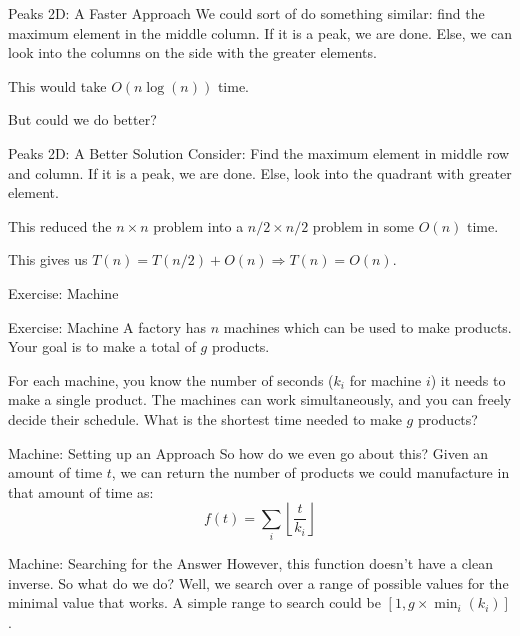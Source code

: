 \documentclass[9pt]{beamer}
\newenvironment{exbox}[1]{\begin{block}{Exercise: #1}}{\end{block}}
\begin{document}
\begin{frame}{Peaks 2D: A Faster Approach}
We could sort of do something similar: find the maximum element in the middle column. If it is a peak, we are done. Else, we can look into the columns on the side with the greater elements.

This would take $O(n\log(n))$ time.

But could we do better?
\end{frame}

\begin{frame}{Peaks 2D: A Better Solution}
Consider: Find the maximum element in middle row and column. If it is a peak, we are done. Else, look into the quadrant with greater element.

This reduced the $n \times n$ problem into a $n/2 \times n/2$ problem in some $O(n)$ time.

This gives us $T(n) = T(n/2) + O(n) \Rightarrow T(n) = O(n)$.
\end{frame}

\begin{frame}{Exercise: Machine}
\begin{exbox}{Machine}
A factory has $n$ machines which can be used to make products. Your goal is to make a total of $g$ products.

For each machine, you know the number of seconds ($k_i$ for machine $i$) it needs to make a single product. The machines can work simultaneously, and you can freely decide their schedule. What is the shortest time needed to make $g$ products?
\end{exbox}
\end{frame}

\begin{frame}{Machine: Setting up an Approach}
So how do we even go about this? Given an amount of time $t$, we can return the number of products we could manufacture in that amount of time as:
\[
f(t) = \sum_i \left\lfloor \frac{t}{k_i} \right\rfloor
\]
\end{frame}

\begin{frame}{Machine: Searching for the Answer}
However, this function doesn't have a clean inverse. So what do we do? Well, we search over a range of possible values for the minimal value that works. A simple range to search could be $[1, g \times \min_i(k_i)]$.
\end{frame}
\end{document}
